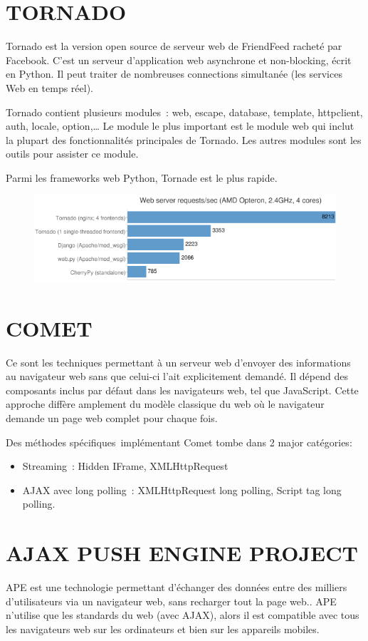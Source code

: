 \documentclass[a4paper,10pt]{report}
\begin{document}
  \section{TORNADO}
Tornado est la version open source de serveur web de FriendFeed racheté par Facebook. C’est un serveur d’application web asynchrone et non-blocking,  écrit en Python. Il peut traiter de nombreuses connections simultanée (les services Web en temps réel).


Tornado contient plusieurs modules : web, escape, database, template, httpclient, auth, locale, option,… Le module le plus important est le module web qui inclut la plupart des fonctionnalités principales de Tornado. Les autres modules sont les outils pour assister ce module.


Parmi les frameworks web Python, Tornade est le plus rapide.
\begin{figure}[!ht]
  \centering
  \includegraphics[scale=0.7, bb=0 0 601 175]{img/Tornado.png} 
\end{figure} 

  \section{COMET}
Ce sont les techniques permettant à un serveur web d'envoyer des informations au navigateur web sans que celui-ci l'ait explicitement demandé.  Il dépend des composants inclus par défaut dans les navigateurs web, tel que JavaScript. Cette approche diffère amplement du modèle classique du web où le navigateur demande un page web complet pour chaque fois.

Des méthodes spécifiques implémentant Comet tombe dans 2 major catégories:
\begin{itemize}
\item Streaming : Hidden IFrame, XMLHttpRequest
\item AJAX avec long polling : XMLHttpRequest long polling, Script tag long polling.
\end{itemize}

  \section{AJAX PUSH ENGINE PROJECT}
APE est une technologie permettant d'échanger des données entre des milliers d'utilisateurs via un navigateur web, sans recharger tout la page web.. APE n’utilise que les standards du web (avec AJAX), alors il est compatible avec tous les navigateurs web sur les ordinateurs et bien sur les appareils mobiles.
\end{document}
